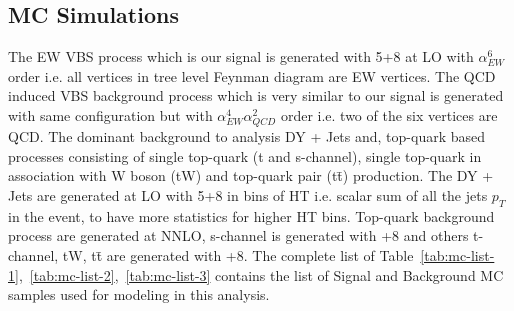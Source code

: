 \subsection{
  MC Simulations
}

The \gls{EW} \gls{VBS} process which is our signal is
generated with \MADGRAPH{}5+\PYTHIA{}8 at \gls{LO} with \( \alpha_{EW}^{6} \) order
i.e.
all vertices in tree level Feynman diagram are \gls{EW} vertices.
The \gls{QCD} induced \gls{VBS} background process which is very
similar to our signal is generated with same configuration
but with \( \alpha_{EW}^{4} \alpha_{QCD}^{2} \) order i.e.
two of the six vertices are \gls{QCD}. The dominant background to analysis
\gls{DY} + Jets and, top-quark based processes consisting of
single top-quark (t and s-channel),
single top-quark in association with W boson (tW) and top-quark pair (t\=t) production.
The \gls{DY} + Jets are generated at \gls{LO} with \MADGRAPH{}5+\PYTHIA{}8
in bins of HT i.e.
scalar sum of all the jets \( p_{T} \) in the event, to have more statistics
for higher HT bins. Top-quark background process are generated at \gls{NNLO},
s-channel is generated with \MGvATNLO+\PYTHIA{}8 and others
t-channel, tW, t\=t are generated with \POWHEG{}+\PYTHIA{}8.
The complete list of Table~\ref{tab:mc-list-1},~\ref{tab:mc-list-2},~\ref{tab:mc-list-3} contains
the list of Signal and Background MC samples used for modeling in this analysis.

